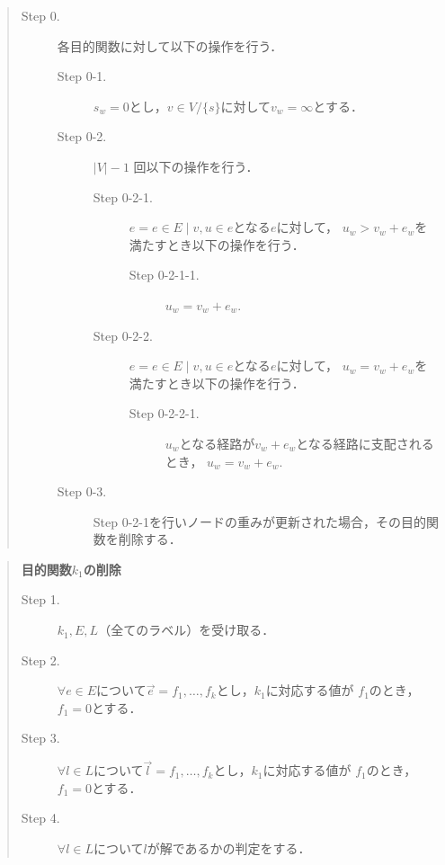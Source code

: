 \documentclass[12pt]{optlab-bachelor}
\begin{document}
\begin{quote}
  \begin{description}
    \item[Step 0.] 各目的関数に対して以下の操作を行う．
    \begin{description}
      \item[Step 0-1.] $s_w = 0$とし，$v \in V/\{s\}$に対して$v_w = \infty$とする．
      \item[Step 0-2.] $|V|-1$ 回以下の操作を行う．
      \begin{description}
        \item[Step 0-2-1.] $e = {e \in E \mid v,u \in e}$となる$e$に対して，
        $u_w > v_w + e_w$を満たすとき以下の操作を行う．
        \begin{description}
          \item[Step 0-2-1-1.] $u_w = v_w + e_w$.
        \end{description}
        \item[Step 0-2-2.] $e = {e \in E \mid v,u \in e}$となる$e$に対して，
        $u_w = v_w + e_w$を満たすとき以下の操作を行う．
        \begin{description}
          \item[Step 0-2-2-1.] $u_w$となる経路が$v_w + e_w$となる経路に支配されるとき，
          $u_w = v_w + e_w$.
        \end{description}
      \end{description}
      \item[Step 0-3.] Step 0-2-1を行いノードの重みが更新された場合，その目的関数を削除する．
    \end{description}
  \end{description}
\end{quote}

\begin{quote}
  \textbf{目的関数$k_1$の削除}
  \begin{description}
    \item[Step 1.] $k_1,E,L$（全てのラベル）を受け取る．
    \item[Step 2.] $\forall e \in E$について$\vec{e}={f_1,\ldots,f_k}$とし，$k_1$に対応する値が
    $f_1$のとき，$f_1=0$とする．
    \item[Step 3.] $\forall l \in L$について$\vec{l}={f_1,\ldots,f_k}$とし，$k_1$に対応する値が
    $f_1$のとき，$f_1=0$とする．
    \item[Step 4.] $\forall l \in L$について$l$が解であるかの判定をする．
  \end{description}
\end{quote}
\end{document}

